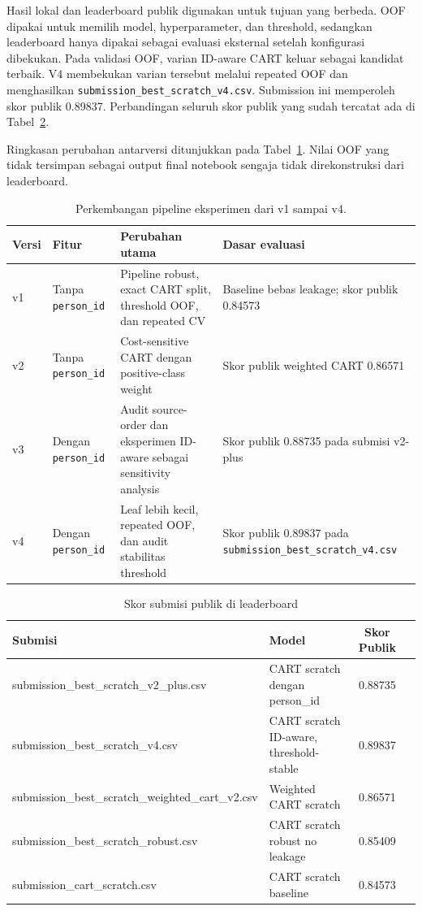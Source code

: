 \documentclass[10pt,a4paper]{article}
\begin{document}
Hasil lokal dan leaderboard publik digunakan untuk tujuan yang berbeda. OOF dipakai untuk memilih model,
hyperparameter, dan threshold, sedangkan leaderboard hanya dipakai sebagai evaluasi eksternal setelah
konfigurasi dibekukan. Pada validasi OOF, varian ID-aware CART keluar sebagai kandidat terbaik. V4
membekukan varian tersebut melalui repeated OOF dan menghasilkan
\texttt{submission\_best\_scratch\_v4.csv}. Submission ini memperoleh skor publik 0.89837.
Perbandingan seluruh skor publik yang sudah tercatat ada di
Tabel~\ref{tab:lb}.

Ringkasan perubahan antarversi ditunjukkan pada Tabel~\ref{tab:versions}. Nilai OOF yang tidak
tersimpan sebagai output final notebook sengaja tidak direkonstruksi dari leaderboard.

\begin{table}[h]
\centering
\small
\begin{tabularx}{\textwidth}{l l X X}
\toprule
\textbf{Versi} & \textbf{Fitur} & \textbf{Perubahan utama} & \textbf{Dasar evaluasi} \\
\midrule
v1 & Tanpa \texttt{person\_id} & Pipeline robust, exact CART split, threshold OOF, dan repeated CV & Baseline bebas leakage; skor publik 0.84573 \\
v2 & Tanpa \texttt{person\_id} & Cost-sensitive CART dengan positive-class weight & Skor publik weighted CART 0.86571 \\
v3 & Dengan \texttt{person\_id} & Audit source-order dan eksperimen ID-aware sebagai sensitivity analysis & Skor publik 0.88735 pada submisi v2-plus \\
v4 & Dengan \texttt{person\_id} & Leaf lebih kecil, repeated OOF, dan audit stabilitas threshold & Skor publik 0.89837 pada \texttt{submission\_best\_scratch\_v4.csv} \\
\bottomrule
\end{tabularx}
\caption{Perkembangan pipeline eksperimen dari v1 sampai v4.}
\label{tab:versions}
\end{table}

\begin{table}[h]
\centering
\small
\begin{tabularx}{\textwidth}{lXcc}
\toprule
\textbf{Submisi} & \textbf{Model} & \textbf{Skor Publik} \\
\midrule
submission\_best\_scratch\_v2\_plus.csv & CART scratch dengan person\_id & 0.88735 \\
submission\_best\_scratch\_v4.csv & CART scratch ID-aware, threshold-stable & 0.89837 \\
submission\_best\_scratch\_weighted\_cart\_v2.csv & Weighted CART scratch & 0.86571 \\
submission\_best\_scratch\_robust.csv & CART scratch robust no leakage & 0.85409 \\
submission\_cart\_scratch.csv & CART scratch baseline & 0.84573 \\
\bottomrule
\end{tabularx}
\caption{Skor submisi publik di leaderboard}
\label{tab:lb}
\end{table}
\end{document}
